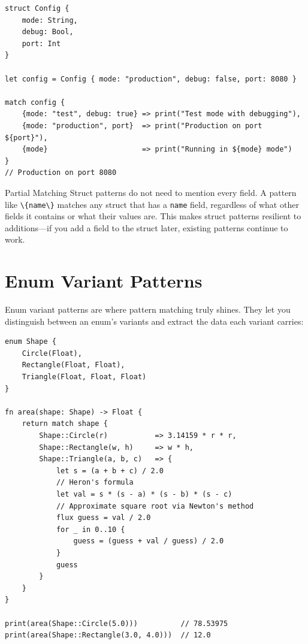 \begin{lstlisting}[language=Lattice, caption={Mixed shorthand and value patterns}]
struct Config {
    mode: String,
    debug: Bool,
    port: Int
}

let config = Config { mode: "production", debug: false, port: 8080 }

match config {
    {mode: "test", debug: true} => print("Test mode with debugging"),
    {mode: "production", port}  => print("Production on port ${port}"),
    {mode}                      => print("Running in ${mode} mode")
}
// Production on port 8080
\end{lstlisting}

\begin{tipbox}{Partial Matching}
Struct patterns do not need to mention every field. A pattern like \lstinline|\{name\}| matches any struct that has a \lstinline|name| field, regardless of what other fields it contains or what their values are. This makes struct patterns resilient to additions---if you add a field to the struct later, existing patterns continue to work.
\end{tipbox}

\section{Enum Variant Patterns}\label{sec:enum-patterns}

Enum variant patterns are where pattern matching truly shines. They let you distinguish between an enum's variants and extract the data each variant carries:

\begin{lstlisting}[language=Lattice, caption={Matching enum variants}]
enum Shape {
    Circle(Float),
    Rectangle(Float, Float),
    Triangle(Float, Float, Float)
}

fn area(shape: Shape) -> Float {
    return match shape {
        Shape::Circle(r)           => 3.14159 * r * r,
        Shape::Rectangle(w, h)     => w * h,
        Shape::Triangle(a, b, c)   => {
            let s = (a + b + c) / 2.0
            // Heron's formula
            let val = s * (s - a) * (s - b) * (s - c)
            // Approximate square root via Newton's method
            flux guess = val / 2.0
            for _ in 0..10 {
                guess = (guess + val / guess) / 2.0
            }
            guess
        }
    }
}

print(area(Shape::Circle(5.0)))          // 78.53975
print(area(Shape::Rectangle(3.0, 4.0)))  // 12.0
\end{lstlisting}

